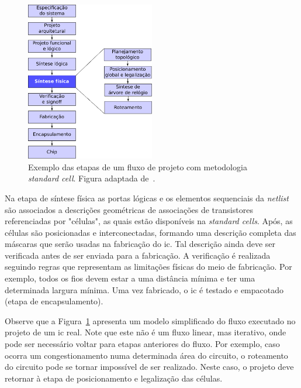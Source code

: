 \begin{figure}[]
    \centering
    \includegraphics[width=0.5\textwidth]{img/introducao/exemplo_fluxo.pdf}
    \caption[Etapas do fluxo \textit{standard cell}.]{Exemplo das etapas de um fluxo de projeto com metodologia \textit{standard cell}. Figura adaptada de~.}
    \label{fig:exemplo_fluxo}
\end{figure}

Na etapa de síntese física as portas lógicas e os elementos sequenciais da \textit{netlist} são associados a descrições geométricas de associações de transistores referenciadas por "células", as quais estão disponíveis na \textit{standard cells}.
Após, as células são posicionadas e interconectadas, formando uma descrição completa das máscaras que serão usadas na fabricação do \ac{ic}.
Tal descrição ainda deve ser verificada antes de ser enviada para a fabricação.
A verificação é realizada seguindo regras que representam as limitações físicas do meio de fabricação.
Por exemplo, todos os fios devem estar a uma distância mínima e ter uma determinada largura mínima.
Uma vez fabricado, o \ac{ic} é testado e empacotado (etapa de encapsulamento).

Observe que a Figura~\ref{fig:exemplo_fluxo} apresenta um modelo simplificado do fluxo executado no projeto de um \ac{ic} real.
Note que este não é um fluxo linear, mas iterativo, onde pode ser necessário voltar para etapas anteriores do fluxo.
Por exemplo, caso ocorra um congestionamento numa determinada área do circuito, o roteamento do circuito pode se tornar impossível de ser realizado. Neste caso, o projeto deve retornar à etapa de posicionamento e legalização das células.

